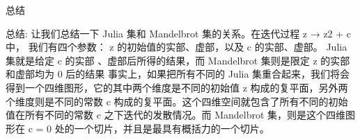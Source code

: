 \documentclass{beamer}
\begin{document}
\begin{frame}{总结}

  总结: 
  让我们总结一下 Julia 集和 Mandelbrot 集的关系。在迭代过程 z → z2 + c 中，
  我们有四个参数： z 的初始值的实部、虚部，以及 c 的实部、虚部。 Julia 集就是给定 c 的实部
  、虚部后所得的结果，而 Mandelbrot 集则是限定 z 的实部和虚部均为 0 后的结果
  事实上，如果把所有不同的 Julia 集重合起来，我们将会得到一个四维图形，它的其中两个维度是不同的初始值
   z 构成的复平面，另外两个维度则是不同的常数 c 构成的复平面。这个四维空间就包含了所有不同的初始值在所有不同的常数
    c 之下迭代的发散情况。而 Mandelbrot 集，则是这个四维图形在 c = 0 处的一个切片，并且是最具有概括力的一个切片。
  \cite{second}
\end{frame}
\begin{frame}
  
  
\end{frame}
\end{document}
